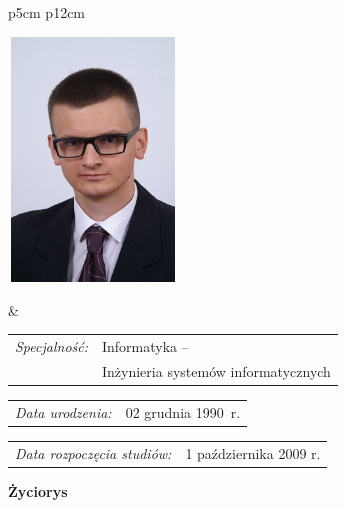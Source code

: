 \begin{titlepage}
    \newpage\thispagestyle{empty}
    \begin{tabular}{p{5cm} p{12cm}}
    \begin{minipage}{5cm}
    \center
    \includegraphics[height=6.5cm,width=4.5cm]{img/foto.jpg}
    \end{minipage}
    &
    \begin{minipage}{12cm}
    \begin{flushleft}
    \par\noindent\vspace{1\baselineskip}
    \begin{tabular}[h]{l l}
    {\normalsize\it Specjalność:} & Informatyka -- \\
    & Inżynieria systemów informatycznych
    \end{tabular}
    \par\noindent\vspace{1\baselineskip}
    \begin{tabular}[h]{l l}
    {\normalsize\it Data urodzenia:} & {\normalsize 02 grudnia 1990~r.}
    \end{tabular}
    \par\noindent\vspace{1\baselineskip}
    \begin{tabular}[h]{l l}
    {\normalsize\it Data rozpoczęcia studiów:} & {\normalsize 1 października 2009 r.}
    \end{tabular}
    \par\noindent\vspace{1\baselineskip}
    \end{flushleft}
    \end{minipage}
    \end{tabular}
    \vspace*{1\baselineskip}
    \begin{center}
	{\large\bfseries Życiorys}\par\bigskip
    \end{center}


\end{titlepage}
